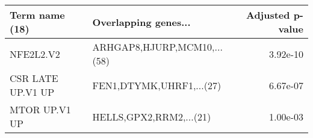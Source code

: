 \begin{tabular}{llr}
\toprule
   Term name (18) &        Overlapping genes... &  Adjusted p-value \\
\midrule
        NFE2L2.V2 & ARHGAP8,HJURP,MCM10,...(58) &          3.92e-10 \\
CSR LATE UP.V1 UP &    FEN1,DTYMK,UHRF1,...(27) &          6.67e-07 \\
    MTOR UP.V1 UP &     HELLS,GPX2,RRM2,...(21) &          1.00e-03 \\
\bottomrule
\end{tabular}
